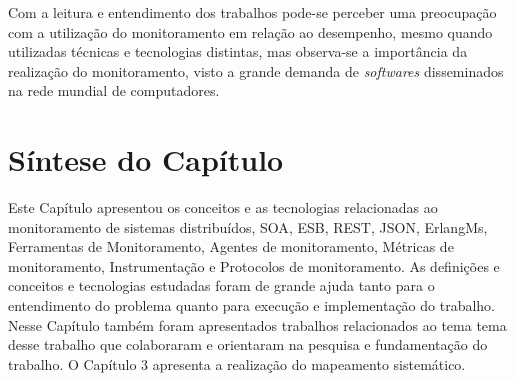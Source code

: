 Com a leitura e entendimento dos trabalhos pode-se perceber uma preocupação com a utilização do monitoramento em relação ao desempenho, mesmo quando utilizadas técnicas e tecnologias distintas, mas observa-se a importância da realização do monitoramento, visto a grande demanda de \textit{softwares} disseminados na rede mundial de computadores.


\section{Síntese do Capítulo}

Este Capítulo apresentou os conceitos e as tecnologias relacionadas ao monitoramento de sistemas distribuídos, \acrshort{SOA}, \acrshort{ESB},  \acrshort{REST}, \acrshort{JSON}, ErlangMs, Ferramentas de Monitoramento, Agentes de monitoramento, Métricas de monitoramento, Instrumentação e Protocolos de monitoramento. As definições e conceitos e tecnologias estudadas foram de grande ajuda tanto para o entendimento do problema quanto para execução e implementação do trabalho. Nesse Capítulo também foram apresentados trabalhos relacionados ao tema tema desse trabalho que colaboraram e orientaram na pesquisa e fundamentação do trabalho. O Capítulo 3 apresenta a realização do mapeamento sistemático.


